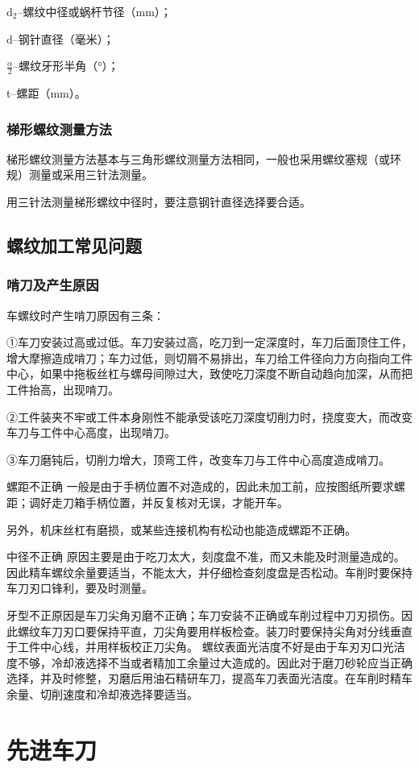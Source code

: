 \documentclass{ctexbook}
\begin{document}
d$_2$--螺纹中径或蜗杆节径（mm）；

d--钢针直径（毫米）；

$\frac{\alpha}{2}$--螺纹牙形半角（°）；

t--螺距（mm）。
\subsubsection{梯形螺纹测量方法}
梯形螺纹测量方法基本与三角形螺纹测量方法相同，一般也采用螺纹塞规（或环规）测量或采用三针法测量。

用三针法测量梯形螺纹中径时，要注意钢针直径选择要合适。
\subsection{螺纹加工常见问题}
\subsubsection{啃刀及产生原因}
车螺纹时产生啃刀原因有三条：

①车刀安装过高或过低。车刀安装过高，吃刀到一定深度时，车刀后面顶住工件，增大摩擦造成啃刀；车力过低，则切屑不易排出，车刀给工件径向力方向指向工件中心，如果中拖板丝杠与螺母间隙过大，致使吃刀深度不断自动趋向加深，从而把工件抬高，出现啃刀。

②工件装夹不牢或工件本身刚性不能承受该吃刀深度切削力时，挠度变大，而改变车刀与工件中心高度，出现啃刀。

③车刀磨钝后，切削力增大，顶弯工件，改变车刀与工件中心高度造成啃刀。

螺距不正确 一般是由于手柄位置不对造成的，因此未加工前，应按图纸所要求螺距；调好走刀箱手柄位置，并反复核对无误，才能开车。

另外，机床丝杠有磨损，或某些连接机构有松动也能造成螺距不正确。

中径不正确 原因主要是由于吃刀太大，刻度盘不准，而又未能及时测量造成的。因此精车螺纹余量要适当，不能太大，并仔细检查刻度盘是否松动。车削时要保持车刀刃口锋利，要及时测量。

牙型不正原因是车刀尖角刃磨不正确；车刀安装不正确或车削过程中刀刃损伤。因此螺纹车刀刃口要保持平直，刀尖角要用样板检查。装刀时要保持尖角对分线垂直于工件中心线，并用样板校正刀尖角。
螺纹表面光洁度不好是由于车刃刃口光洁度不够，冷却液选择不当或者精加工余量过大造成的。因此对于磨刀砂轮应当正确选择，并及时修整，刃磨后用油石精研车刀，提高车刀表面光洁度。在车削时精车余量、切削速度和冷却液选择要适当。
\section{先进车刀}
\end{document}
